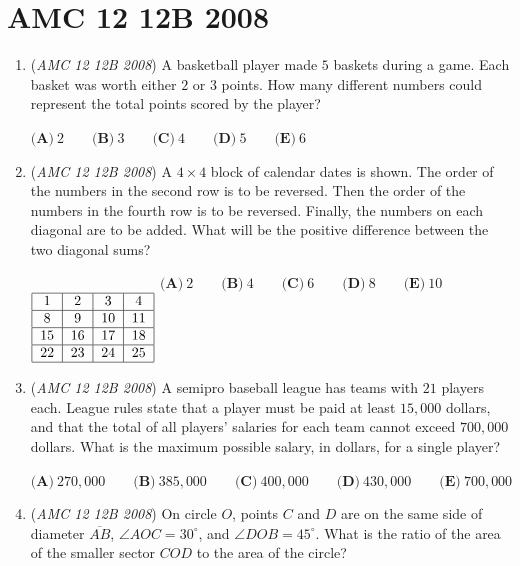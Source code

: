 \section{AMC 12 12B 2008}
        \begin{enumerate}
        	\item (\textit{AMC 12 12B 2008}) A basketball player made $5$ baskets during a game. Each basket was worth either $2$ or $3$ points. How many different numbers could represent the total points scored by the player?


 $\textbf{(A)}\ 2 \qquad \textbf{(B)}\ 3 \qquad \textbf{(C)}\ 4 \qquad \textbf{(D)}\ 5 \qquad \textbf{(E)}\ 6$


	\item (\textit{AMC 12 12B 2008}) A $4\times 4$ block of calendar dates is shown. The order of the numbers in the second row is to be reversed. Then the order of the numbers in the fourth row is to be reversed. Finally, the numbers on each diagonal are to be added. What will be the positive difference between the two diagonal sums?


 $\begin{tabular}[t]{|c|c|c|c|} \multicolumn{4}{c}{}\\\hline 1&2&3&4\\\hline 8&9&10&11\\\hline 15&16&17&18\\\hline 22&23&24&25\\\hline \end{tabular}$
$\textbf{(A)}\ 2 \qquad \textbf{(B)}\ 4 \qquad \textbf{(C)}\ 6 \qquad \textbf{(D)}\ 8 \qquad \textbf{(E)}\ 10$


	\item (\textit{AMC 12 12B 2008}) A semipro baseball league has teams with $21$ players each. League rules state that a player must be paid at least $15,000$ dollars, and that the total of all players' salaries for each team cannot exceed $700,000$ dollars. What is the maximum possible salary, in dollars, for a single player?


 $\textbf{(A)}\ 270,000 \qquad \textbf{(B)}\ 385,000 \qquad \textbf{(C)}\ 400,000 \qquad \textbf{(D)}\ 430,000 \qquad \textbf{(E)}\ 700,000$


	\item (\textit{AMC 12 12B 2008}) On circle $O$, points $C$ and $D$ are on the same side of diameter $\overline{AB}$, $\angle AOC = 30^\circ$, and $\angle DOB = 45^\circ$. What is the ratio of the area of the smaller sector $COD$ to the area of the circle?



\end{enumerate}
